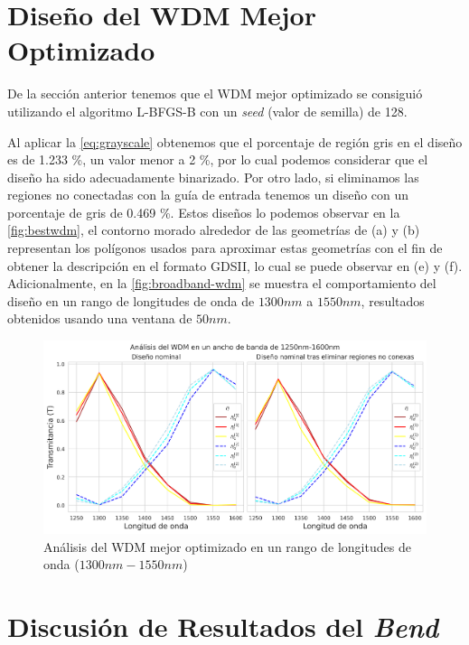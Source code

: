 \section{Diseño del WDM Mejor Optimizado}\label{sec:best-wdm}

De la sección anterior tenemos que el WDM mejor optimizado se consiguió
utilizando el algoritmo L-BFGS-B con un \emph{seed} (valor de semilla) de 128.

Al aplicar la \autoref{eq:grayscale} obtenemos que el porcentaje de región gris en el diseño
es de 1.233 \%, un valor menor a 2 \%, por lo cual podemos considerar que el diseño ha sido
adecuadamente binarizado. 
Por otro lado, si eliminamos las regiones no conectadas con la guía de entrada
tenemos un diseño con un porcentaje de gris de 0.469 \%.
Estos diseños lo podemos observar en la \autoref{fig:bestwdm},
el contorno morado alrededor de las geometrías de (a) y (b) representan los polígonos
usados para aproximar estas geometrías con el fin de obtener la descripción en el formato
GDSII, lo cual se puede observar en (e) y (f).
Adicionalmente, en la \autoref{fig:broadband-wdm} se muestra el comportamiento del diseño
en un rango de longitudes de onda de $1300nm$ a $1550 nm$, resultados obtenidos usando una ventana de $50nm$.

\begin{figure}[ht]
  \centering
  \includegraphics[width=\textwidth]{image/results/wdm/best/broadband-wdm.png}
  \caption{Análisis del WDM mejor optimizado en un rango de longitudes de onda ($1300 nm-1550 nm$)}
  \label{fig:broadband-wdm}
\end{figure}



\section{Discusión de Resultados del \emph{Bend}}

